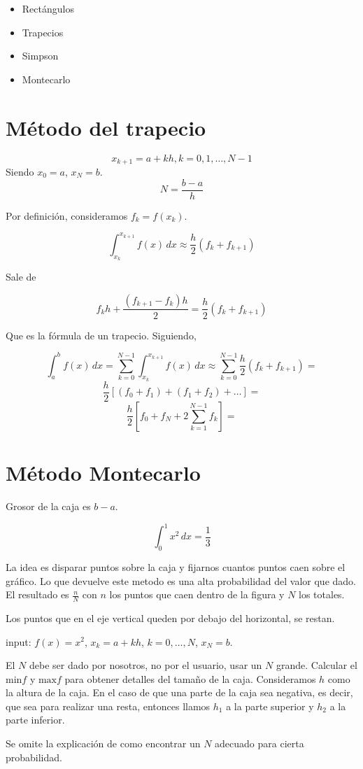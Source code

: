\begin{itemize}

	\item Rect\'angulos
	\item Trapecios
	\item Simpson
	\item Montecarlo

\end{itemize}

\section{M\'etodo del trapecio}


$$ x_{k+1} = a +kh, k = 0,1,\dotsc, N-1$$
Siendo $x_0 = a$, $x_N = b$. $$N = \frac{b-a}{h}$$

Por definici\'on, consideramos $f_k = f(x_k)$.

$$ \int_{x_k}^{x_{k+1}}\! f(x) \, dx \approx \frac{h}{2}(f_k + f_{k+1}) $$

Sale de

$$ f_{k}h + \frac{(f_{k+1} - f_k)h}{2} = \frac{h}{2}(f_k + f_{k+1}) $$

Que es la f\'ormula de un trapecio. Siguiendo,

$$ 
\int_a^b\! f(x) \, dx = 
\sum_{k = 0}^{N-1} \int_{x_{k}}^{x_{k+1}}\! f(x) \, dx \approx 
\sum_{k = 0}^{N-1} \frac{h}{2}(f_k + f_{k+1}) = 
$$
$$
\frac{h}{2}\left[ (f_0 + f_1) + (f_1 + f_2) + \dotsc \right] =
$$
$$
\frac{h}{2}\left[ f_0 + f_N + 2\sum_{k = 1}^{N-1}f_k \right] =
$$

\section{M\'etodo Montecarlo}


Grosor de la caja es $b - a$.

$$\int_0^1 \! x^2 \, dx = \frac{1}{3}$$


La idea es disparar puntos sobre la caja y fijarnos cuantos puntos caen sobre el gr\'afico. Lo que devuelve este metodo es una alta probabilidad del valor que dado. El resultado es $\frac{n}{N}$ con $n$ los puntos que caen dentro de la figura y $N$ los totales.

Los puntos que en el eje vertical queden por debajo del horizontal, se restan.

input: $f(x) = x^2$, $x_k = a + kh$, $k = 0,\dotsc, N$, $x_N = b$.

El $N$ debe ser dado por nosotros, no por el usuario, usar un $N$ grande. Calcular el $\text{min} f$ y $\text{max} f$ para obtener detalles del tamaño de la caja. Consideramos $h$ como la altura de la caja. En el caso de que una parte de la caja sea negativa, es decir, que sea para realizar una resta, entonces llamos $h_1$ a la parte superior y $h_2$ a la parte inferior.

Se omite la explicaci\'on de como encontrar un $N$ adecuado para cierta probabilidad.

